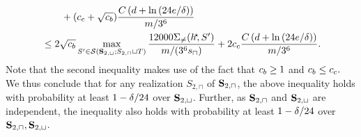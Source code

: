 \begin{proofof}{}
\begin{align}
    & \qquad +(c_c+\sqrt{c_b}) \frac{C\left(d+\ln{(24e/\delta  )}\right)}{m/3^6} \notag
    \\
    & \leq2\sqrt{c_b}\max\limits_{S'\in\mathcal{S}(\mathbf{S}_{2,\sqcup};S_{2,\sqcap}\sqcup T)} 
    \frac{12000\Sigma_{\not=}(h^{\negmedspace\star}\negmedspace,S')}{m/(3^6 s_{\sqcap})}+2c_c \frac{C\left(d+\ln{(24e/\delta  )}\right)}{m/3^6}.
\end{align}
Note that the second inequality makes use of the fact that $ c_b\geq1 $ and $ c_b\leq c_c.$  
We thus conclude that for any realization $ S_{2,\sqcap} $ of $ \mathbf{S}_{2,\sqcap} $, the above inequality holds with probability at least $1-\delta/24$ over $ \mathbf{S}_{2,\sqcup} $. Further, as $\mathbf{S}_{2,\sqcap} $ and $ \mathbf{S}_{2,\sqcup} $ are independent, the inequality also holds with probability at least $ 1-\delta/24 $ over $ \mathbf{S}_{2,\sqcap},\mathbf{S}_{2,\sqcup}$.



\end{proofof}
